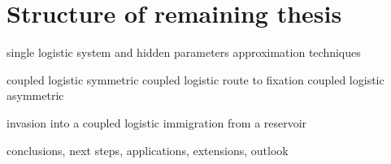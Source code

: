 \documentclass[a4paper,11pt]{article}
\numberwithin{equation}{section} %
\begin{document}
\section{Structure of remaining thesis}
single logistic system and hidden parameters
approximation techniques

coupled logistic symmetric
coupled logistic route to fixation
coupled logistic asymmetric

invasion into a coupled logistic
immigration from a reservoir

conclusions, next steps, applications, extensions, outlook







\iffalse
\section{proposed thesis structure}
Lit review
1D log
2D log, symmetric
2D log, asymmetric
Moran with immigration (influx of an immigrant from a static reservoir)
Closing remarks

Lit Review:
Demographic stochastics
Extinction rates from demographic and environmental stochasticity
Approximation techniques
How things can be calculated exactly
Concept of a niche, the debates therein
Concept of competitive exclusion, debates therein
Biodiversity
Moran and other simple stochastic models
Lotka-Volterra
Deterministically supporting multiple species
\fi




\iffalse


\end{document}
